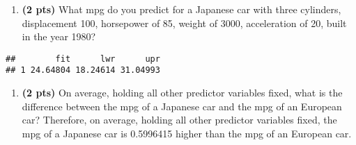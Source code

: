 \documentclass[
]{article}
\newenvironment{Shaded}{\begin{snugshade}}{\end{snugshade}}
\newcommand{\AttributeTok}[1]{\textcolor[rgb]{0.77,0.63,0.00}{#1}}
\newcommand{\DecValTok}[1]{\textcolor[rgb]{0.00,0.00,0.81}{#1}}
\newcommand{\FunctionTok}[1]{\textcolor[rgb]{0.00,0.00,0.00}{#1}}
\newcommand{\NormalTok}[1]{#1}
\newcommand{\OtherTok}[1]{\textcolor[rgb]{0.56,0.35,0.01}{#1}}
\newcommand{\SpecialCharTok}[1]{\textcolor[rgb]{0.00,0.00,0.00}{#1}}
\newcommand{\StringTok}[1]{\textcolor[rgb]{0.31,0.60,0.02}{#1}}
\providecommand{\tightlist}{%
  \setlength{\itemsep}{0pt}\setlength{\parskip}{0pt}}
\begin{document}
\begin{enumerate}
\def\labelenumi{(\alph{enumi})}
\setcounter{enumi}{2}
\tightlist
\item
  \textbf{(2 pts)} What mpg do you predict for a Japanese car with three
  cylinders, displacement 100, horsepower of 85, weight of 3000,
  acceleration of 20, built in the year 1980?
\end{enumerate}

\begin{Shaded}
\end{Shaded}

\begin{verbatim}
##        fit      lwr      upr
## 1 24.64804 18.24614 31.04993
\end{verbatim}

\begin{enumerate}
\def\labelenumi{(\alph{enumi})}
\setcounter{enumi}{3}
\tightlist
\item
  \textbf{(2 pts)} On average, holding all other predictor variables
  fixed, what is the difference between the mpg of a Japanese car and
  the mpg of an European car? Therefore, on average, holding all other
  predictor variables fixed, the mpg of a Japanese car is 0.5996415
  higher than the mpg of an European car.
\end{enumerate}
\end{document}
